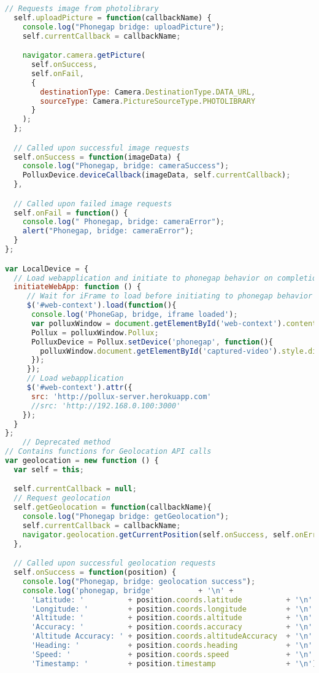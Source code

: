 \begin{appendices}
\begin{lstlisting}[language=JavaScript]
  // Requests image from photolibrary
  self.uploadPicture = function(callbackName) {
    console.log("Phonegap bridge: uploadPicture");
    self.currentCallback = callbackName;

    navigator.camera.getPicture(
      self.onSuccess,
      self.onFail,
      {
        destinationType: Camera.DestinationType.DATA_URL,
        sourceType: Camera.PictureSourceType.PHOTOLIBRARY
      }
    );
  };

  // Called upon successful image requests
  self.onSuccess = function(imageData) {
    console.log("Phonegap, bridge: cameraSuccess");
    PolluxDevice.deviceCallback(imageData, self.currentCallback);
  },

  // Called upon failed image requests
  self.onFail = function() {
    console.log(" Phonegap, bridge: cameraError");
    alert("Phonegap, bridge: cameraError");
  }
};

var LocalDevice = {
  // Load webapplication and initiate to phonegap behavior on completion
  initiateWebApp: function () {
     // Wait for iFrame to load before initiating to phonegap behavior
     $('#web-context').load(function(){
      console.log('PhoneGap, bridge, iframe loaded');
      var polluxWindow = document.getElementById('web-context').contentWindow;
      Pollux = polluxWindow.Pollux;
      PolluxDevice = Pollux.setDevice('phonegap', function(){
        polluxWindow.document.getElementById('captured-video').style.display = "none";
      });
     });
     // Load webapplication
     $('#web-context').attr({
      src: 'http://pollux-server.herokuapp.com'
      //src: 'http://192.168.0.100:3000'
    });
  }
};
    // Deprecated method
// Contains functions for Geolocation API calls
var geolocation = new function () {
  var self = this;

  self.currentCallback = null;
  // Request geolocation
  self.getGeolocation = function(callbackName){
    console.log("Phonegap bridge: getGeolocation");
    self.currentCallback = callbackName;
    navigator.geolocation.getCurrentPosition(self.onSuccess, self.onError, {timeout: 10000});
  },

  // Called upon successful geolocation requests
  self.onSuccess = function(position) {
    console.log("Phonegap, bridge: geolocation success");
    console.log('phonegap, bridge'          + '\n' +
      'Latitude: '          + position.coords.latitude          + '\n' +
      'Longitude: '         + position.coords.longitude         + '\n' +
      'Altitude: '          + position.coords.altitude          + '\n' +
      'Accuracy: '          + position.coords.accuracy          + '\n' +
      'Altitude Accuracy: ' + position.coords.altitudeAccuracy  + '\n' +
      'Heading: '           + position.coords.heading           + '\n' +
      'Speed: '             + position.coords.speed             + '\n' +
      'Timestamp: '         + position.timestamp                + '\n');


\end{lstlisting}
\end{appendices}
